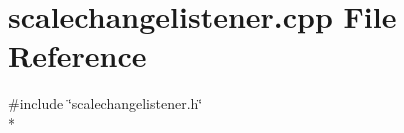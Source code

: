 \section{scalechangelistener.\+cpp File Reference}
\label{scalechangelistener_8cpp}
{\ttfamily \#include \char`\"{}scalechangelistener.\+h\char`\"{}}\\*
